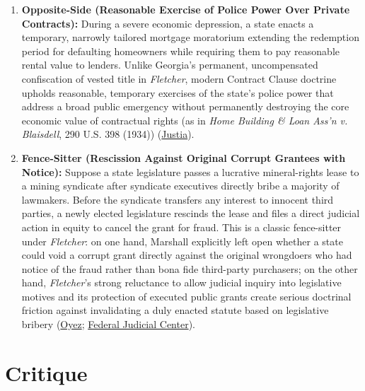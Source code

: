 \documentclass[12pt]{article}
\begin{document}
\begin{enumerate}
\item \textbf{Opposite-Side (Reasonable Exercise of Police Power Over Private Contracts):} During a severe economic depression, a state enacts a temporary, narrowly tailored mortgage moratorium extending the redemption period for defaulting homeowners while requiring them to pay reasonable rental value to lenders. Unlike Georgia's permanent, uncompensated confiscation of vested title in \textit{Fletcher}, modern Contract Clause doctrine upholds reasonable, temporary exercises of the state's police power that address a broad public emergency without permanently destroying the core economic value of contractual rights (as in \textit{Home Building \& Loan Ass'n v. Blaisdell}, 290 U.S. 398 (1934)) (\href{https://supreme.justia.com/cases/federal/us/313/362/}{Justia}).

\item \textbf{Fence-Sitter (Rescission Against Original Corrupt Grantees with Notice):} Suppose a state legislature passes a lucrative mineral-rights lease to a mining syndicate after syndicate executives directly bribe a majority of lawmakers. Before the syndicate transfers any interest to innocent third parties, a newly elected legislature rescinds the lease and files a direct judicial action in equity to cancel the grant for fraud. This is a classic fence-sitter under \textit{Fletcher}: on one hand, Marshall explicitly left open whether a state could void a corrupt grant directly against the original wrongdoers who had notice of the fraud rather than bona fide third-party purchasers; on the other hand, \textit{Fletcher}'s strong reluctance to allow judicial inquiry into legislative motives and its protection of executed public grants create serious doctrinal friction against invalidating a duly enacted statute based on legislative bribery (\href{https://www.oyez.org/cases/1789-1850/10us87}{Oyez}; \href{https://www.fjc.gov/history/cases/cases-that-shaped-the-federal-courts/fletcher-v-peck}{Federal Judicial Center}).
\end{enumerate}

\section{Critique}
\end{document}
